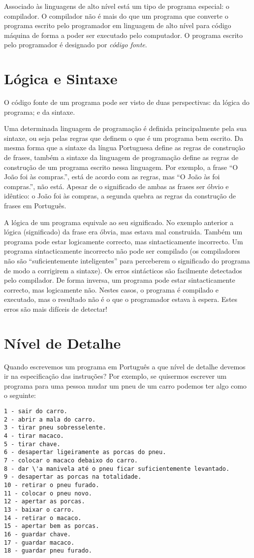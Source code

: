 Associado às linguagens de alto nível está um tipo de programa especial: o compilador. O compilador não é mais do que um programa que converte o programa escrito pelo programador em linguagem de alto nível para código máquina de forma a poder ser executado pelo computador. O programa escrito pelo programador é designado por \emph{código fonte}.


\section{Lógica e Sintaxe}
O código fonte de um programa pode ser visto de duas perspectivas: da lógica do programa; e da sintaxe.

Uma determinada linguagem de programação é definida principalmente pela sua sintaxe, ou seja pelas regras que definem o que é um programa bem escrito. Da mesma forma que a sintaxe da língua Portuguesa define as regras de construção de frases, também a sintaxe da linguagem de programação define as regras de construção de um programa escrito nessa linguagem. Por exemplo, a frase ``O João foi às compras.'', está de acordo com as regras, mas ``O João às foi compras.'', não está. Apesar de o significado de ambas as frases ser óbvio e idêntico: o João foi às compras, a segunda quebra as regras da construção de frases em Português.

A lógica de um programa equivale ao seu significado. No exemplo anterior a lógica (significado) da frase era óbvia, mas estava mal construida. Também um programa pode estar logicamente correcto, mas sintacticamente incorrecto. Um programa sintacticamente incorrecto não pode ser compilado (os compiladores não são ``suficientemente inteligentes'' para perceberem o significado do programa de modo a corrigirem a sintaxe). Os erros sintácticos são facilmente detectados pelo compilador.
De forma inversa, um programa pode estar sintacticamente correcto, mas logicamente não. Nestes casos, o programa é compilado e executado, mas o resultado não é o que o programador estava à espera. Estes erros são mais difíceis de detectar!




\section{Nível de Detalhe}
Quando escrevemos um programa em Português a que nível de detalhe devemos ir na especificação das instruções?
Por exemplo, se quisermos escrever um programa para uma pessoa mudar um pneu de um carro podemos ter algo como o seguinte:
\begin{verbatim}
1 - sair do carro.
2 - abrir a mala do carro.
3 - tirar pneu sobresselente.
4 - tirar macaco.
5 - tirar chave.
6 - desapertar ligeiramente as porcas do pneu.
7 - colocar o macaco debaixo do carro.
8 - dar \'a manivela até o pneu ficar suficientemente levantado.
9 - desapertar as porcas na totalidade.
10 - retirar o pneu furado.
11 - colocar o pneu novo.
12 - apertar as porcas.
13 - baixar o carro.
14 - retirar o macaco.
15 - apertar bem as porcas.
16 - guardar chave.
17 - guardar macaco.
18 - guardar pneu furado.
\end{verbatim}


